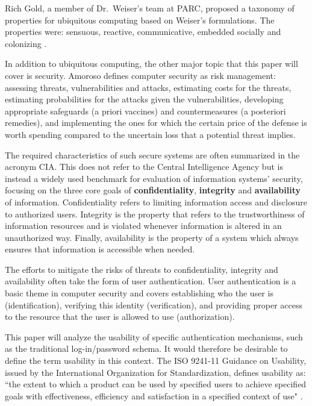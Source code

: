 \documentclass{article}
\begin{document}
Rich Gold, a member of Dr.\ Weiser's team at PARC, proposed a taxonomy of properties for ubiquitous computing based on Weiser's formulations. The properties were: sensuous, reactive, communicative, embedded socially and colonizing \cite{gold2007plenitude}. 

In addition to ubiquitous computing, the other major topic that this paper will cover is security. Amoroso \cite{amoroso1994fundamentals} defines computer security as risk management: assessing threats, vulnerabilities and attacks, estimating costs for the threats, estimating probabilities for the attacks given the vulnerabilities, developing appropriate safeguards (a priori vaccines) and countermeasures (a posteriori remedies), and implementing the ones for which the certain price of the defense is worth spending compared to the uncertain loss that a potential threat implies. 

The required characteristics of such secure systems are often summarized in the acronym CIA. This does not refer to the Central Intelligence Agency but is instead a widely used benchmark for evaluation of information systems' security, focusing on the three core goals of \textbf{confidentiality}, \textbf{integrity} and \textbf{availability} of information. Confidentiality refers to limiting information access and disclosure to authorized users. Integrity is the property that refers to the trustworthiness of information resources and is violated whenever information is altered in an unauthorized way. Finally, availability is the property of a system which always ensures that information is accessible when needed. 

The efforts to mitigate the risks of threats to confidentiality, integrity and availability often take the form of user authentication. User authentication is a basic theme in computer security and covers establishing who the user is (identification), verifying this identity (verification), and providing proper access to the resource that the user is allowed to use (authorization). 

This paper will analyze the usability of specific authentication mechanisms, such as the traditional log-in/password schema. It would therefore be desirable to define the term usability in this context. The ISO 9241-11 Guidance on Usability, issued by the International Organization for Standardization, defines usability as: ``the extent to which a product can be used by specified users to achieve specified goals with effectiveness, efficiency and satisfaction in a specified context of use" \cite{iso1998international}.
\end{document}
